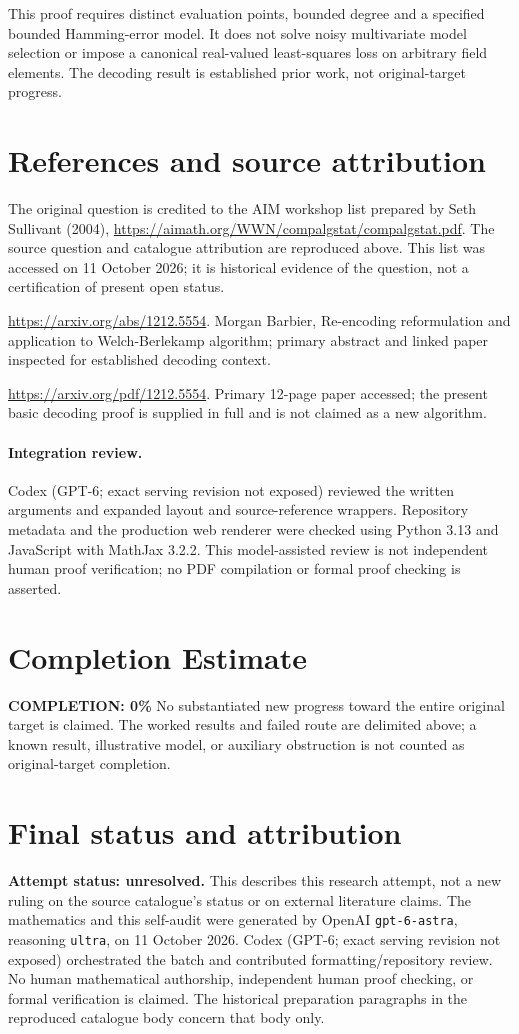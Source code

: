 \documentclass[11pt]{article}
\begin{document}
This proof requires distinct evaluation points, bounded degree and a specified bounded Hamming-error model. It does not solve noisy multivariate model selection or impose a canonical real-valued least-squares loss on arbitrary field elements. The decoding result is established prior work, not original-target progress.

\section{References and source attribution}
The original question is credited to the AIM workshop list prepared by Seth Sullivant (2004), \url{https://aimath.org/WWN/compalgstat/compalgstat.pdf}. The source question and catalogue attribution are reproduced above. This list was accessed on 11 October 2026; it is historical evidence of the question, not a certification of present open status.

\url{https://arxiv.org/abs/1212.5554}. Morgan Barbier, Re-encoding reformulation and application to Welch-Berlekamp algorithm; primary abstract and linked paper inspected for established decoding context.

\url{https://arxiv.org/pdf/1212.5554}. Primary 12-page paper accessed; the present basic decoding proof is supplied in full and is not claimed as a new algorithm.


\paragraph{Integration review.} Codex (GPT-6; exact serving revision not exposed) reviewed the written arguments and expanded layout and source-reference wrappers. Repository metadata and the production web renderer were checked using Python 3.13 and JavaScript with MathJax 3.2.2. This model-assisted review is not independent human proof verification; no PDF compilation or formal proof checking is asserted.

\section{Completion Estimate}
\noindent\textbf{COMPLETION: 0\%}
No substantiated new progress toward the entire original target is claimed. The worked results and failed route are delimited above; a known result, illustrative model, or auxiliary obstruction is not counted as original-target completion.

\section{Final status and attribution}
\textbf{Attempt status: unresolved.} This describes this research attempt, not a new ruling on the source catalogue's status or on external literature claims.
The mathematics and this self-audit were generated by OpenAI \texttt{gpt-6-astra}, reasoning \texttt{ultra}, on 11 October 2026. Codex (GPT-6; exact serving revision not exposed) orchestrated the batch and contributed formatting/repository review. No human mathematical authorship, independent human proof checking, or formal verification is claimed. The historical preparation paragraphs in the reproduced catalogue body concern that body only.
\end{document}
